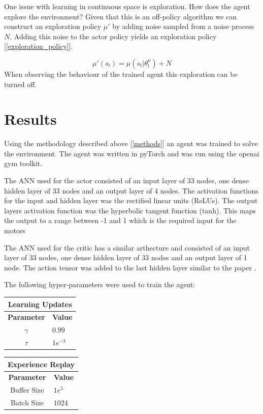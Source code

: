 \documentclass[12pt]{article}
\begin{document}
One issue with learning in continuous space is exploration.
How does the agent explore the environment?
Given that this is an off-policy algorithm we can construct an exploration policy $\mu'$ by adding noise sampled from a noise process $N$.
Adding this noise to the actor policy yields an exploration policy [\ref{exploration_policy}].

\begin{equation}
\label{exploration_policy}
\mu'(s_t) = \mu(s_t|\theta_t^\mu) + N
\end{equation}
When observing the behaviour of the trained agent this exploration can be turned off.

\section{Results}
Using the methodology described above [\ref{methods}] an agent was trained to solve the environment.
The agent was written in pyTorch and was run using the openai gym toolkit.

The ANN used for the actor consisted of an input layer of 33 nodes, one dense hidden layer of 33 nodes and an output layer of 4 nodes.
The activation functions for the input and hidden layer was the rectified linear units (ReLUs). 
The output layers activation function was the hyperbolic tangent function (tanh). 
This maps the output to a range between -1 and 1 which is the required input for the motors

The ANN used for the critic has a similar arthecture and consisted of an input layer of 33 nodes, one dense hidden layer of 33 nodes and an output layer of 1 node. The action tensor was added to the last hidden layer similar to the paper \cite{ddpg_paper}.

The following hyper-parameters were used to train the agent:

\begin{table}[h!t]
\begin{minipage}{.5\linewidth}
\begin{tabular}{|c|l|}
	\hline
	\multicolumn{2}{|c|}{\textbf{Learning Updates}}\\
	\hline
	\hline
	\textbf{Parameter} & \textbf{Value}\\
	\hline
	$\gamma$ & $0.99$\\
	$\tau$ & $1e^{-3}$\\
	\hline
\end{tabular}
\end{minipage}
\begin{minipage}{.5\linewidth}
\begin{tabular}{|c|l|}
	\hline
	\multicolumn{2}{|c|}{\textbf{Experience Replay}}\\
	\hline
	\hline
	\textbf{Parameter} & \textbf{Value}\\
	\hline
	Buffer Size & $1e^{5}$\\
	Batch Size & $1024$\\
	\hline
\end{tabular}
\end{minipage}
\end{table}
\end{document}
